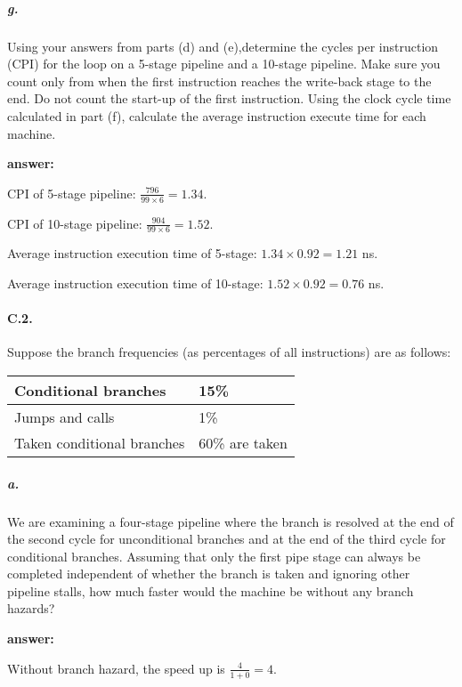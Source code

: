 \documentclass{article}
\begin{document}
\subparagraph{g.} Using your answers from parts (d) and (e),determine the cycles per instruction (CPI) for the loop on a 5-stage pipeline and a 10-stage pipeline. Make sure you count only from when the first instruction reaches the write-back stage to the end. Do not count the start-up of the first instruction. Using the clock cycle time calculated in part (f), calculate the average instruction execute time for each machine.

\noindent \textbf{answer:}

CPI of 5-stage pipeline: $\frac{796}{99\times 6}=1.34$.

CPI of 10-stage pipeline: $\frac{904}{99\times 6}=1.52$.

Average instruction execution time of 5-stage: $1.34\times0.92=1.21$ ns.

Average instruction execution time of 10-stage: $1.52\times0.92=0.76$ ns.

\paragraph{C.2.} Suppose the branch frequencies (as percentages of all instructions) are as follows:

\begin{table}[ht!]
\begin{center}
\begin{tabular}{l|l} %
    \toprule
    Conditional branches & 15\%\\
    \hline
    Jumps and calls & 1\%\\
    \hline
    Taken conditional branches &60\% are taken\\
    \bottomrule
    \end{tabular}
\end{center}
\end{table}
\vspace{-1cm}
\subparagraph{a.} We are examining a four-stage pipeline where the branch is resolved at the end of the second cycle for unconditional branches and at the end of the third cycle for conditional branches. Assuming that only the first pipe stage can always be completed independent of whether the branch is taken and ignoring other pipeline stalls, how much faster would the machine be without any branch hazards? 

\noindent \textbf{answer:}

Without branch hazard, the speed up is $\frac{4}{1+0}=4$.
\end{document}
